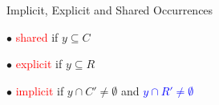 \documentclass{beamer}
\begin{document}
\begin{frame}{Implicit, Explicit and Shared Occurrences}
   \parbox{0.45\textwidth}{\hspace{3mm}$\bullet$ \textcolor{red}{shared} if $y \subseteq C$}
   \parbox{0.45\textwidth}{\hspace{3mm}$\bullet$ \textcolor{red}{explicit} if $y \subseteq R$ }

    \parbox{\textwidth}{\hspace{3mm}$\bullet$ \textcolor{red}{implicit} if $y \cap C' \neq \emptyset$ and \textcolor{blue}{$y \cap R' \neq \emptyset$}}
\end{frame}
 
\end{document}
